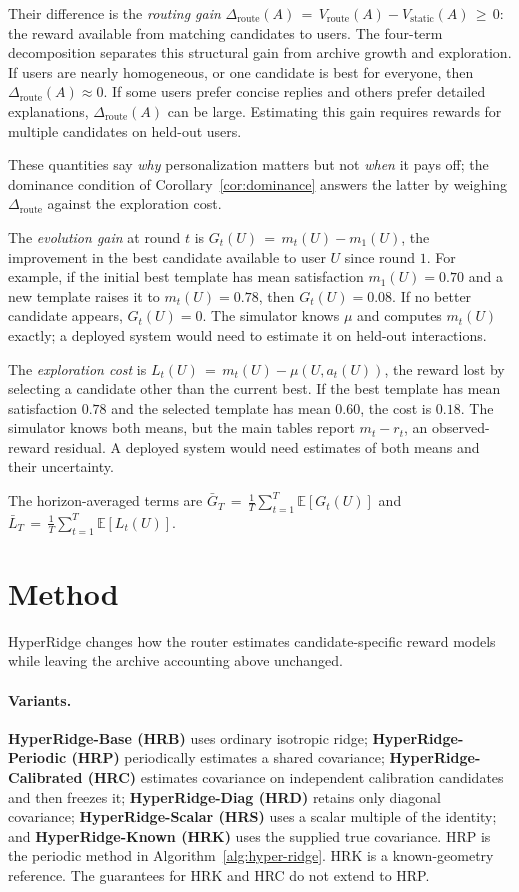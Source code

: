 \documentclass{article} %
\providecommand{\E}{\mathbb{E}}
\begin{document}
Their difference is the \emph{routing gain} $\Delta_{\mathrm{route}}(A) \,=\, V_{\mathrm{route}}(A) - V_{\mathrm{static}}(A) \,\geq\, 0$: the reward available from matching candidates to users. The four-term decomposition separates this structural gain from archive growth and exploration. If users are nearly homogeneous, or one candidate is best for everyone, then $\Delta_{\mathrm{route}}(A) \approx 0$. If some users prefer concise replies and others prefer detailed explanations, $\Delta_{\mathrm{route}}(A)$ can be large. Estimating this gain requires rewards for multiple candidates on held-out users.

These quantities say \emph{why} personalization matters but not \emph{when} it pays off; the dominance condition of Corollary~\ref{cor:dominance} answers the latter by weighing $\Delta_{\mathrm{route}}$ against the exploration cost.

The \emph{evolution gain} at round $t$ is $G_t(U) \,=\, m_t(U) - m_1(U)$, the improvement in the best candidate available to user $U$ since round $1$. For example, if the initial best template has mean satisfaction $m_1(U) = 0.70$ and a new template raises it to $m_t(U) = 0.78$, then $G_t(U) = 0.08$. If no better candidate appears, $G_t(U) = 0$. The simulator knows $\mu$ and computes $m_t(U)$ exactly; a deployed system would need to estimate it on held-out interactions.

The \emph{exploration cost} is $L_t(U) \,=\, m_t(U) - \mu(U, a_t(U))$, the reward lost by selecting a candidate other than the current best. If the best template has mean satisfaction $0.78$ and the selected template has mean $0.60$, the cost is $0.18$. The simulator knows both means, but the main tables report \(m_t-r_t\), an observed-reward residual. A deployed system would need estimates of both means and their uncertainty.


The horizon-averaged terms are $\bar G_T \,=\, \frac{1}{T}\sum_{t=1}^T \E[G_t(U)]$ and $\bar L_T \,=\, \frac{1}{T}\sum_{t=1}^T \E[L_t(U)]$.

\section{Method}
\label{sec:method}

HyperRidge changes how the router estimates candidate-specific reward models while leaving the archive accounting above unchanged.

\paragraph{Variants.}
\textbf{HyperRidge-Base (HRB)} uses ordinary isotropic ridge;
\textbf{HyperRidge-Periodic (HRP)} periodically estimates a shared covariance;
\textbf{HyperRidge-Calibrated (HRC)} estimates covariance on independent
calibration candidates and then freezes it;
\textbf{HyperRidge-Diag (HRD)} retains only diagonal covariance;
\textbf{HyperRidge-Scalar (HRS)} uses a scalar multiple of the identity; and
\textbf{HyperRidge-Known (HRK)} uses the supplied true covariance.
HRP is the periodic method in Algorithm~\ref{alg:hyper-ridge}.
HRK is a known-geometry reference.
The guarantees for HRK and HRC do not extend to HRP.
\end{document}
